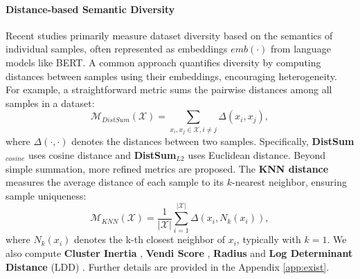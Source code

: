 \paragraph{Distance-based Semantic Diversity}  
Recent studies primarily measure dataset diversity based on the semantics of individual samples, often represented as embeddings $emb(\cdot)$ from language models like BERT. A common approach quantifies diversity by computing distances between samples using their embeddings, encouraging heterogeneity. 
For example, a straightforward metric sums the pairwise distances among all samples in a dataset:
\begin{equation}  
    \mathcal{M}_{DistSum}(\mathcal{X}) = \sum_{x_i, x_j \in \mathcal{X}, i \neq j} \Delta(x_i, x_j),
\end{equation}  
where $\Delta(\cdot, \cdot)$ denotes the distances between two samples. Specifically, \textbf{DistSum$_{cosine}$} uses cosine distance and \textbf{DistSum$_{L2}$} uses Euclidean distance.
Beyond simple summation, more refined metrics are proposed. The \textbf{KNN distance} \cite{stasaski2020more-KNN, stasaski2022semantic-KNN} measures the average distance of each sample to its $k$-nearest neighbor, ensuring sample uniqueness: 
\begin{equation}  
    \mathcal{M}_{KNN}(\mathcal{X}) = \frac{1}{|\mathcal{X}|} \sum_{i=1}^{|\mathcal{X}|} \Delta(x_i, N_k(x_i)),
\end{equation}
where $N_k(x_i)$ denotes the k-th closest neighbor of $x_i$, typically with $k=1$. 
We also compute \textbf{Cluster Inertia} \cite{du2019boosting-Inertia}, \textbf{Vendi Score} \cite{pasarkar2023cousins-Vendi}, \textbf{Radius} \cite{lai2020diversity-Radius} and \textbf{Log Determinant Distance} (LDD) \cite{wang2024diversity-logD}. Further details are provided in the Appendix \ref{app:exist}.

